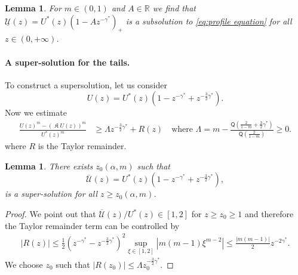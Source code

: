 \documentclass[a4paper]{article}
\newtheorem{lemma}[theorem]{Lemma}
\theoremstyle{definition}
\DeclareMathOperator{\fixedpoint}{\mathfrak K}
\begin{document}
\begin{lemma}
For $m \in (0,1)$ and $A\in \mathbb R$ we find that $\underline{\mathcal U}(z) = U^*(z) ( 1 - A z^{-\gamma^*})_+$ is a subsolution to \eqref{eq:profile equation} for all $z \in (0, +\infty)$.
\end{lemma}
%

\paragraph{A super-solution for the tails.}
To construct a supersolution, let us consider
\begin{equation}
\label{eq:m < 1 tail supersolution}
U(z) = U^*(z) \left( 1 - z^{-\gamma^*} + z^{-\frac{3}{2}\gamma^*} \right).
\end{equation}
Now we estimate
\begin{align*}
\frac{U(z)^m - (\fixedpoint U(z))^m}{U^*(z)^m}
& \ge \Lambda z^{-\frac{3}{2}\gamma^*}
%
%
+ R(z)  \quad \text{where } \Lambda =  m - \frac{\mathsf Q(\frac{2}{1-m}+\frac{3}{2}\gamma^*)}{\mathsf Q(\frac{2}{1-m})} \ge 0.
\end{align*}
where $R$ is the Taylor remainder.
\begin{lemma}
\label{lem:fast supersolution tails}
There exists $z_0(\alpha, m)$ such that
\begin{equation}
  \label{eq:fast supersolution tails}
  \overline{\mathcal U}(z) = U^*(z) (1 - z^{-\gamma^*} + z^{-\frac 3 2\gamma^*} ),
\end{equation}
is a super-solution for all $z \ge z_0(\alpha,m)$.
\end{lemma}
\begin{proof}
We point out that $\overline{\mathcal U}(z) / U^*(z) \in [1,2]$ for $z \ge z_0 \ge 1$ and therefore
the Taylor remainder term can be controlled by
\begin{align*}
  |R(z)| \le  \frac{1}{2}\left( z^{-\gamma^*} - z^{-\frac 3 2 \gamma^*}  \right)^2 \sup_{\xi \in [1,2]} |m(m-1) \xi^{m-2}| \le  \frac{|m (m-1)|}{2} z^{-2\gamma^*} .
\end{align*}
We choose $z_0$ such that $|R(z_0)| \le \Lambda z_0^{-\frac 3 2 \gamma^*}$.
\end{proof}
%

%
%
%
%
%
%
%
%
%
%
%
%
%
%
%
%
%
%
%
%
%
%
%
%
%
%
%
%
%
%
%
%
%
%
%
%
%
%
%
%
%
%
%
%
%
%
%
%
%
%
%
%
%

%

%
%
%
%
%
%

%
%
%
%
%
%
%
%
\end{document}
